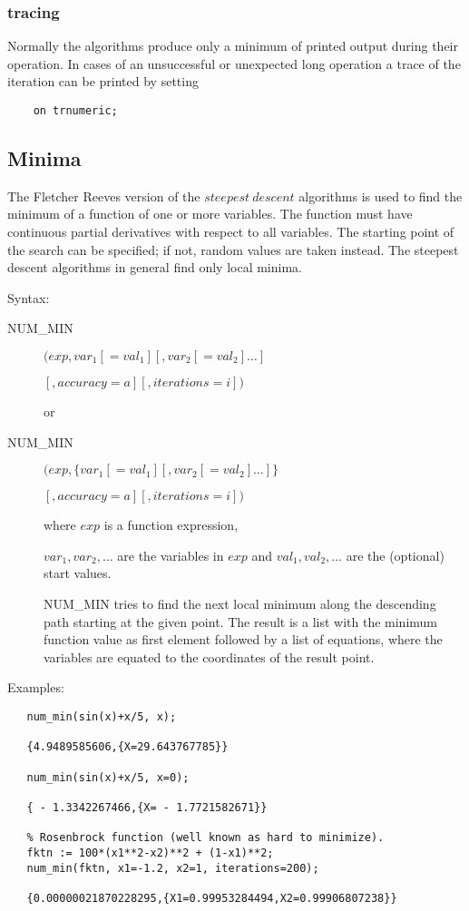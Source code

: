 \subsubsection{tracing}
Normally the algorithms produce only a minimum of printed
output during their operation. In cases of an unsuccessful
or unexpected long operation a trace of the iteration can be
printed by setting
\begin{verbatim}
    on trnumeric;
\end{verbatim}


\subsection{Minima}

The Fletcher Reeves version of the $steepest\ descent$
algorithms is used to find the minimum of a
function of one or more variables. The
function must have continuous partial derivatives with respect to all
variables. The starting point of the search can be
specified; if not, random values are taken instead.
The steepest descent algorithms in general find only local
minima.

Syntax:

\begin{description}
\item[NUM\_MIN] $(exp, var_1[=val_1] [,var_2[=val_2] \ldots]$

$             [,accuracy=a][,iterations=i]) $

or

\item[NUM\_MIN] $(exp, \{ var_1[=val_1] [,var_2[=val_2] \ldots] \}$

$             [,accuracy=a][,iterations=i]) $


where $exp$ is a function expression,

$var_1, var_2, \ldots$ are the variables in $exp$ and
$val_1,val_2, \ldots$ are the (optional) start values.

NUM\_MIN tries to find the next local minimum along the descending
path starting at the given point. The result is a list
with the minimum function value as first element followed by a list
of equations, where the variables are equated to the coordinates
of the result point.
\end{description}

Examples:

\begin{verbatim}
   num_min(sin(x)+x/5, x);

   {4.9489585606,{X=29.643767785}}

   num_min(sin(x)+x/5, x=0);

   { - 1.3342267466,{X= - 1.7721582671}}

   % Rosenbrock function (well known as hard to minimize).
   fktn := 100*(x1**2-x2)**2 + (1-x1)**2;
   num_min(fktn, x1=-1.2, x2=1, iterations=200);

   {0.00000021870228295,{X1=0.99953284494,X2=0.99906807238}}

\end{verbatim}

